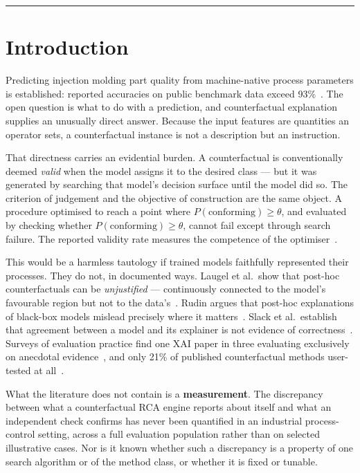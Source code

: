 \documentclass[11pt,a4paper]{article}
\begin{document}
\vspace{1em}\hrule\vspace{1em}

\section{Introduction}

Predicting injection molding part quality from machine-native process parameters is established: reported accuracies on public benchmark data exceed 93\%~\cite{polenta2022}. The open question is what to do with a prediction, and counterfactual explanation supplies an unusually direct answer. Because the input features are quantities an operator sets, a counterfactual instance is not a description but an instruction.

That directness carries an evidential burden. A counterfactual is conventionally deemed \emph{valid} when the model assigns it to the desired class --- but it was generated by searching that model's decision surface until the model did so. The criterion of judgement and the objective of construction are the same object. A procedure optimised to reach a point where $P(\text{conforming}) \geq \theta$, and evaluated by checking whether $P(\text{conforming}) \geq \theta$, cannot fail except through search failure. The reported validity rate measures the competence of the optimiser~\cite{laugel2019,keane2021}.

This would be a harmless tautology if trained models faithfully represented their processes. They do not, in documented ways. Laugel et al.\ show that post-hoc counterfactuals can be \emph{unjustified} --- continuously connected to the model's favourable region but not to the data's~\cite{laugel2019}. Rudin argues that post-hoc explanations of black-box models mislead precisely where it matters~\cite{rudin2019}. Slack et al.\ establish that agreement between a model and its explainer is not evidence of correctness~\cite{slack2020}. Surveys of evaluation practice find one XAI paper in three evaluating exclusively on anecdotal evidence~\cite{nauta2023}, and only 21\% of published counterfactual methods user-tested at all~\cite{keane2021}.

What the literature does not contain is a \textbf{measurement}. The discrepancy between what a counterfactual RCA engine reports about itself and what an independent check confirms has never been quantified in an industrial process-control setting, across a full evaluation population rather than on selected illustrative cases. Nor is it known whether such a discrepancy is a property of one search algorithm or of the method class, or whether it is fixed or tunable.
\end{document}
